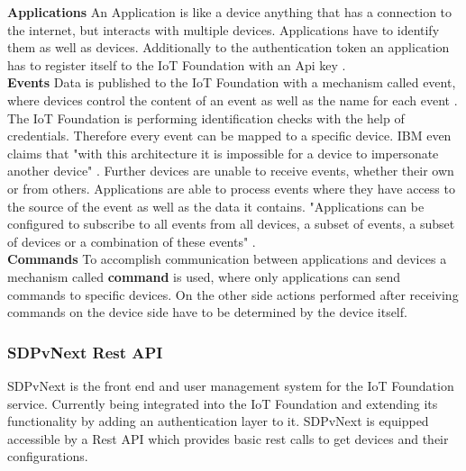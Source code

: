 			\textbf{Applications}
				An Application is like a device anything that has a connection to the internet, but interacts with multiple devices. Applications have to identify them as well as devices. Additionally to the authentication token an application has to register itself to the IoT Foundation with an Api key \parencite{IoTFoundationOverview}.\\

			\textbf{Events}
				Data is published to the IoT Foundation with a mechanism called event, where devices control the content of an event as well as the name for each event \parencite{IoTFoundationOverview}. The IoT Foundation is performing identification checks with the help of credentials. Therefore every event can be mapped to a specific device. IBM even claims that "with this architecture it is impossible for a device to impersonate another device" \parencite{IoTFoundationOverview}. Further devices are unable to receive events, whether their own or from others. Applications are able to process events where they have access to the source of the event as well as the data it contains. "Applications can be configured to subscribe to all events from all devices, a subset of events, a subset of devices or a combination of these events" \parencite{IoTFoundationOverview}.\\

			\textbf{Commands}
				To accomplish communication between applications and devices a mechanism called \textbf{command} is used, where only applications can send commands to specific devices. On the other side actions performed after receiving commands on the device side have to be determined by the device itself.\\

			
		\subsubsection{SDPvNext Rest API}
			SDPvNext is the front end and user management system for the IoT Foundation service. Currently being integrated into the IoT Foundation and extending its functionality by adding an authentication layer to it. SDPvNext is equipped accessible by a Rest API which provides basic rest calls to get devices and their configurations.

			\pagebreak




